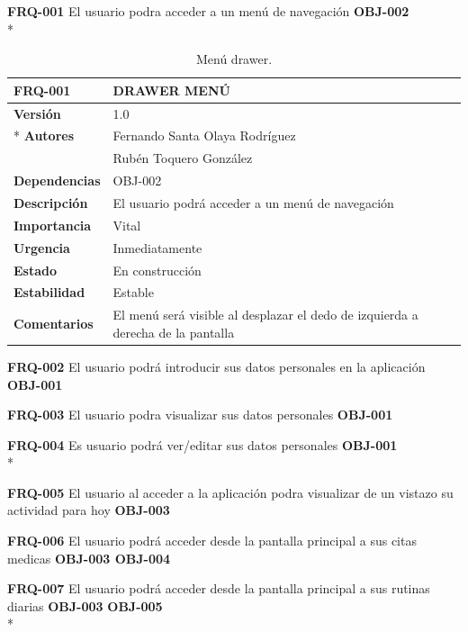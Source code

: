 \documentclass[../pfc.tex]{subfiles}
\begin{document}
	
	\textbf{FRQ-001}	El usuario podra acceder a un menú de navegación	\textbf{OBJ-002}\\*

	\begin{table}[!hbt]
		\centering
		\begin{tabular}[t]{|l|l|}
			\hline \textbf{FRQ-001} & \textbf{DRAWER MENÚ} \\*
			\hline\hline \textbf{Versión} & 1.0 \\ *
			\hline\textbf{Autores} 	& Fernando Santa Olaya Rodríguez\\*
			& Rubén Toquero González\\*
			\hline \textbf{Dependencias} & OBJ-002\\* 			
			\hline \textbf{Descripción} & El usuario podrá acceder a un menú de navegación \\* 
			\hline \textbf{Importancia} & Vital \\* 
			\hline \textbf{Urgencia} & Inmediatamente \\* 
			\hline \textbf{Estado} & En construcción \\* 
			\hline \textbf{Estabilidad} & Estable \\* 
			\hline \textbf{Comentarios} & El menú será visible al desplazar el dedo de izquierda a derecha de la pantalla \\* 
			\hline 
		\end{tabular}
		\caption{Menú drawer.}
		\label{tabla:req001}
	\end{table}
	
	
	\textbf{FRQ-002}	El usuario podrá introducir sus datos personales en la aplicación 	\textbf{OBJ-001}
	
	\textbf{FRQ-003}	El usuario podra visualizar sus datos personales	\textbf{OBJ-001}
	
	\textbf{FRQ-004}	Es usuario podrá ver/editar sus datos personales	\textbf{OBJ-001}\\*
	
	
	
	\textbf{FRQ-005}	El usuario al acceder a la aplicación podra visualizar de un vistazo su actividad para hoy 		\textbf{OBJ-003}
	
	\textbf{FRQ-006}	El usuario podrá acceder desde la pantalla principal a sus citas medicas	\textbf{OBJ-003 OBJ-004}
	
	\textbf{FRQ-007}	El usuario podrá acceder desde la pantalla principal a sus rutinas diarias	\textbf{OBJ-003}  \textbf{OBJ-005}\\*					
	
\end{document}
